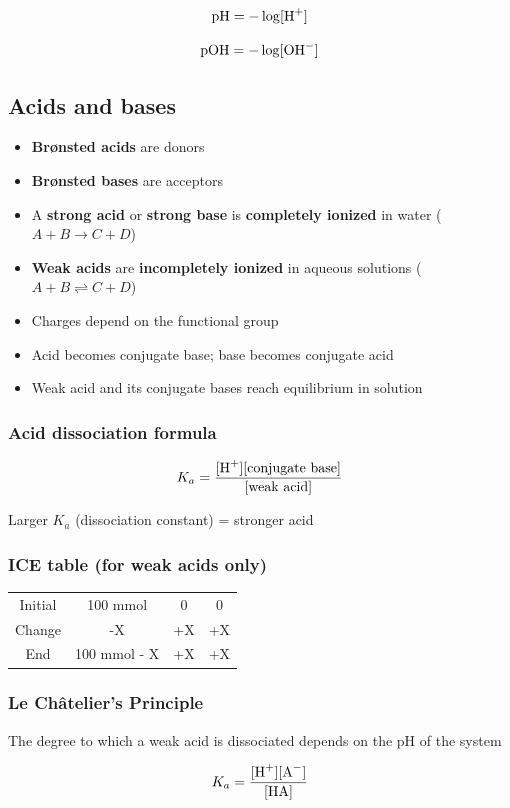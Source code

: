 \documentclass[letterpaper, 12pt]{article}
\begin{document}
\begin{equation} \label{pH}
\mathrm{pH} = -\log [\ce{H+}]
\end{equation}

\begin{equation}
\mathrm{pOH} = -\log [\ce{OH-}]
\end{equation}

\subsection*{Acids and bases}

\begin{itemize}
\item \textbf{Brønsted acids} are  donors
\item \textbf{Brønsted bases} are  acceptors
\item A \textbf{strong acid} or \textbf{strong base} is \textbf{completely ionized} in water ($A + B \to C + D$)
\item \textbf{Weak acids} are \textbf{incompletely ionized} in aqueous solutions ($A + B \rightleftharpoons C + D$)
\item Charges depend on the functional group
\item Acid becomes conjugate base; base becomes conjugate acid
\item Weak acid and its conjugate bases reach equilibrium in solution
\end{itemize}

\subsubsection*{Acid dissociation formula}

 \begin{equation}
K_a = \frac{[\ce{H+}][\text{conjugate base}]}{[\text{weak acid]}}
\end{equation}

Larger $K_a$ (dissociation constant) = stronger acid

\subsubsection*{ICE table (for weak acids only)}

\begin{table}[H]
\centering
\begin{tabular}{cccc}
Initial & 100 mmol & 0 & 0 \\
Change & -X & +X & +X \\
End & 100 mmol - X & +X & +X \\
\end{tabular}
\end{table}

\subsubsection*{Le Châtelier's Principle}

The degree to which a weak acid is dissociated depends on the pH of the system

\begin{equation}
K_a = \frac{[\ce{H+}] [\ce{A-}]} {[\ce{HA}]}
\end{equation}
\end{document}
